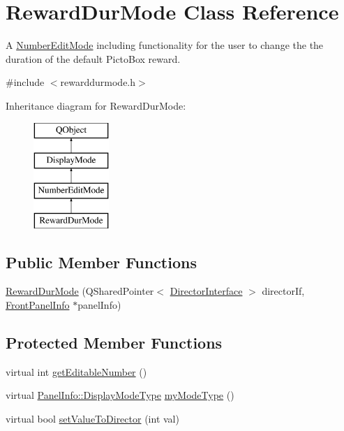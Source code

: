 \hypertarget{class_reward_dur_mode}{\section{Reward\-Dur\-Mode Class Reference}
\label{class_reward_dur_mode}
}


A \hyperlink{class_number_edit_mode}{Number\-Edit\-Mode} including functionality for the user to change the the duration of the default Picto\-Box reward.  




{\ttfamily \#include $<$rewarddurmode.\-h$>$}

Inheritance diagram for Reward\-Dur\-Mode\-:\begin{figure}[H]
\begin{center}
\leavevmode
\includegraphics[height=4.000000cm]{class_reward_dur_mode}
\end{center}
\end{figure}
\subsection*{Public Member Functions}
\begin{DoxyCompactItemize}
\item 
\hyperlink{class_reward_dur_mode_a0b6426927d7d737811ddeb7743612348}{Reward\-Dur\-Mode} (Q\-Shared\-Pointer$<$ \hyperlink{class_director_interface}{Director\-Interface} $>$ director\-If, \hyperlink{class_front_panel_info}{Front\-Panel\-Info} $\ast$panel\-Info)
\end{DoxyCompactItemize}
\subsection*{Protected Member Functions}
\begin{DoxyCompactItemize}
\item 
virtual int \hyperlink{class_reward_dur_mode_a302727b89df5c560dc78f9fa36e90516}{get\-Editable\-Number} ()
\item 
virtual \hyperlink{namespace_panel_info_adb8b98e092c15e831aa524d39701d565}{Panel\-Info\-::\-Display\-Mode\-Type} \hyperlink{class_reward_dur_mode_a4c7c7697715d34ce2c6977fffad84ee9}{my\-Mode\-Type} ()
\item 
virtual bool \hyperlink{class_reward_dur_mode_a00251ffeaf56da8a95352c4747928319}{set\-Value\-To\-Director} (int val)
\end{DoxyCompactItemize}
